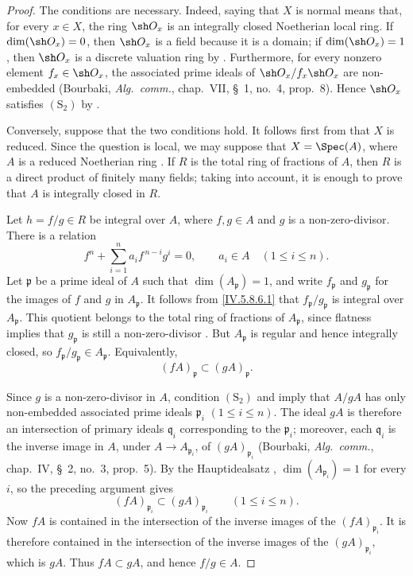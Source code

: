 \begin{proof}
The conditions are necessary.  Indeed, saying that $X$ is normal
means that, for every $x\in X$, the ring $\sh O_x$ is an integrally
closed Noetherian local ring.  If $\dim(\sh O_x)=0$, then $\sh O_x$
is a field because it is a domain; if $\dim(\sh O_x)=1$, then
$\sh O_x$ is a discrete valuation ring by .
Furthermore, for every nonzero element $f_x\in\sh O_x$, the associated
prime ideals of $\sh O_x/f_x\sh O_x$ are non-embedded
(Bourbaki, \emph{Alg.\ comm.}, chap.~VII, \S~1, no.~4, prop.~8).
Hence $\sh O_x$ satisfies $(\mathrm S_2)$ by .

Conversely, suppose that the two conditions hold.  It follows first
from  that $X$ is reduced.  Since the question is
local, we may suppose that $X=\Spec(A)$, where $A$ is a reduced
Noetherian ring .  If $R$ is the total ring of
fractions of $A$, then $R$ is a direct product of finitely many
fields; taking  into account, it is enough to prove
that $A$ is integrally closed in $R$.

Let $h=f/g\in R$ be integral over $A$, where $f,g\in A$ and $g$ is a
non-zero-divisor.  There is a relation
\begin{equation}
\label{IV.5.8.6.1}
  f^n+\sum_{i=1}^{n}a_i f^{\,n-i}g^i=0,
  \qquad a_i\in A\quad(1\leq i\leq n).
\tag{5.8.6.1}
\end{equation}
Let $\mathfrak p$ be a prime ideal of $A$ such that
$\dim(A_{\mathfrak p})=1$, and write $f_{\mathfrak p}$ and
$g_{\mathfrak p}$ for the images of $f$ and $g$ in
$A_{\mathfrak p}$.  It follows from \eqref{IV.5.8.6.1} that
$f_{\mathfrak p}/g_{\mathfrak p}$ is integral over
$A_{\mathfrak p}$.  This quotient belongs to the total ring of
fractions of $A_{\mathfrak p}$, since flatness implies that
$g_{\mathfrak p}$ is still a non-zero-divisor
.  But $A_{\mathfrak p}$ is regular and hence
integrally closed, so
$f_{\mathfrak p}/g_{\mathfrak p}\in A_{\mathfrak p}$.  Equivalently,
\[
  (fA)_{\mathfrak p}\subset (gA)_{\mathfrak p}.
\]

Since $g$ is a non-zero-divisor in $A$, condition $(\mathrm S_2)$
and  imply that $A/gA$ has only non-embedded
associated prime ideals $\mathfrak p_i$ $(1\leq i\leq n)$.  The ideal
$gA$ is therefore an intersection of primary ideals
$\mathfrak q_i$ corresponding to the $\mathfrak p_i$; moreover, each
$\mathfrak q_i$ is the inverse image in $A$, under
$A\to A_{\mathfrak p_i}$, of $(gA)_{\mathfrak p_i}$
(Bourbaki, \emph{Alg.\ comm.}, chap.~IV, \S~2, no.~3, prop.~5).
By the Hauptidealsatz ,
$\dim(A_{\mathfrak p_i})=1$ for every $i$, so the preceding argument
gives
\[
  (fA)_{\mathfrak p_i}\subset(gA)_{\mathfrak p_i}
  \qquad(1\leq i\leq n).
\]
Now $fA$ is contained in the intersection of the inverse images of
the $(fA)_{\mathfrak p_i}$.  It is therefore contained in the
intersection of the inverse images of the $(gA)_{\mathfrak p_i}$,
which is $gA$.  Thus $fA\subset gA$, and hence $f/g\in A$.
\end{proof}

